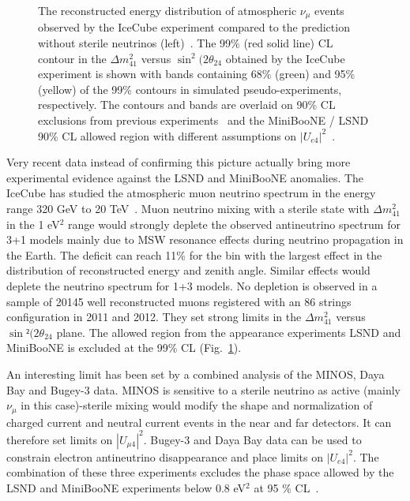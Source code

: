 \begin{figure}[htbp]
    \caption{The reconstructed energy distribution of atmospheric $\nu_\mu$ events observed by the IceCube experiment compared to the prediction without sterile neutrinos (left)~\cite{TheIceCube:2016oqi}. 
The 99\% (red solid line) CL contour in the $\Delta m^2_{41}$ versus $\sin^2 (2 \theta_{24}$ obtained by the IceCube experiment is shown with bands containing
68\% (green) and 95\% (yellow) of the 99\% contours in simulated pseudo-experiments, respectively. The contours and
bands are overlaid on 90\% CL exclusions from previous experiments~\cite{Abe:2014gda, Adamson:2011ku, Cheng:2012yy, DYDAK1984281} and the MiniBooNE / LSND 90\% CL allowed
region with different assumptions on  $|U_{e4}|^2$~\cite{Kopp:2013vaa,Conrad:2012qt}. }
 \label{fig:icecube-sterile}
\end{figure}

Very recent data instead of confirming this picture actually bring more experimental evidence against the LSND and MiniBooNE anomalies.
The IceCube has studied the atmospheric muon neutrino spectrum in the energy range 320 GeV to 20 TeV~\cite{icecubeste}. Muon neutrino mixing with a sterile state with $\Delta m^2_{41}$ in the 1 eV$^2$ range would strongly deplete the observed antineutrino spectrum for 3+1 models mainly due to MSW resonance effects during neutrino propagation in the Earth. The deficit can reach 11\% for the bin with the largest effect in the distribution of reconstructed energy and zenith angle. Similar effects would deplete the neutrino spectrum for 1+3 models. No depletion is observed in a sample of 20145 well reconstructed muons registered with an 86 strings configuration in 2011 and 2012. They set strong limits in the 
$\Delta m^2_{41}$ versus $\sin² (2 \theta_{24}$ plane. The allowed region from the appearance experiments LSND and MiniBooNE is excluded at the 99\% CL (Fig.~\ref{fig:icecube-sterile}).  

An interesting limit has been set by a combined analysis of the MINOS, Daya Bay and Bugey-3 data. MINOS is sensitive to a sterile neutrino as active (mainly $\nu_\mu$ in this case)-sterile mixing would modify the shape and normalization of charged current and neutral current events in the near and far detectors.
It can therefore set limits on $|U_{\mu 4}|^2$. Bugey-3 and Daya Bay data can be used to constrain electron antineutrino disappearance and place limits on $|U_{e 4}|^2$. The combination of these three experiments excludes the phase space allowed by the LSND and MiniBooNE experiments below 0.8 eV$^2$ at 95 \% CL~\cite{dayabaycomb}. 

